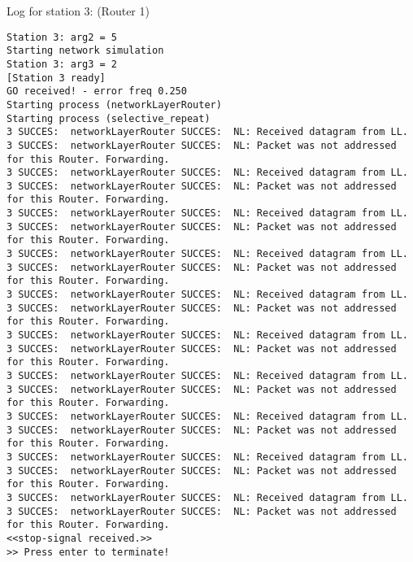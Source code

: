 Log for station 3: (Router 1)
\begin{lstlisting}[breaklines=true]
Station 3: arg2 = 5
Starting network simulation
Station 3: arg3 = 2
[Station 3 ready]
GO received! - error freq 0.250
Starting process (networkLayerRouter)
Starting process (selective_repeat)
3 SUCCES:  networkLayerRouter SUCCES:  NL: Received datagram from LL.
3 SUCCES:  networkLayerRouter SUCCES:  NL: Packet was not addressed for this Router. Forwarding.
3 SUCCES:  networkLayerRouter SUCCES:  NL: Received datagram from LL.
3 SUCCES:  networkLayerRouter SUCCES:  NL: Packet was not addressed for this Router. Forwarding.
3 SUCCES:  networkLayerRouter SUCCES:  NL: Received datagram from LL.
3 SUCCES:  networkLayerRouter SUCCES:  NL: Packet was not addressed for this Router. Forwarding.
3 SUCCES:  networkLayerRouter SUCCES:  NL: Received datagram from LL.
3 SUCCES:  networkLayerRouter SUCCES:  NL: Packet was not addressed for this Router. Forwarding.
3 SUCCES:  networkLayerRouter SUCCES:  NL: Received datagram from LL.
3 SUCCES:  networkLayerRouter SUCCES:  NL: Packet was not addressed for this Router. Forwarding.
3 SUCCES:  networkLayerRouter SUCCES:  NL: Received datagram from LL.
3 SUCCES:  networkLayerRouter SUCCES:  NL: Packet was not addressed for this Router. Forwarding.
3 SUCCES:  networkLayerRouter SUCCES:  NL: Received datagram from LL.
3 SUCCES:  networkLayerRouter SUCCES:  NL: Packet was not addressed for this Router. Forwarding.
3 SUCCES:  networkLayerRouter SUCCES:  NL: Received datagram from LL.
3 SUCCES:  networkLayerRouter SUCCES:  NL: Packet was not addressed for this Router. Forwarding.
3 SUCCES:  networkLayerRouter SUCCES:  NL: Received datagram from LL.
3 SUCCES:  networkLayerRouter SUCCES:  NL: Packet was not addressed for this Router. Forwarding.
3 SUCCES:  networkLayerRouter SUCCES:  NL: Received datagram from LL.
3 SUCCES:  networkLayerRouter SUCCES:  NL: Packet was not addressed for this Router. Forwarding.
<<stop-signal received.>>
>> Press enter to terminate!
\end{lstlisting}

